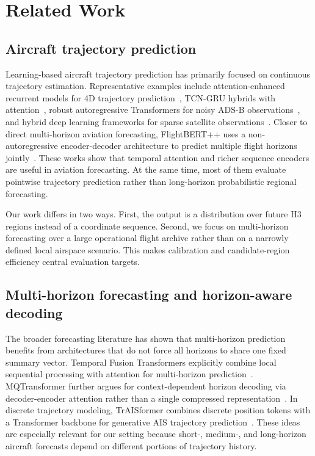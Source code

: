 \section{Related Work}

\subsection{Aircraft trajectory prediction}

Learning-based aircraft trajectory prediction has primarily focused on continuous trajectory estimation. Representative examples include attention-enhanced recurrent models for 4D trajectory prediction~\cite{jia2022attentionlstm}, TCN-GRU hybrids with attention~\cite{ma2024attentiontcngru}, robust autoregressive Transformers for noisy ADS-B observations~\cite{li2025noiserobust}, and hybrid deep learning frameworks for sparse satellite observations~\cite{shan2025sparse}. Closer to direct multi-horizon aviation forecasting, FlightBERT++ uses a non-autoregressive encoder-decoder architecture to predict multiple flight horizons jointly~\cite{guo_flightbertpp_2024}. These works show that temporal attention and richer sequence encoders are useful in aviation forecasting. At the same time, most of them evaluate pointwise trajectory prediction rather than long-horizon probabilistic regional forecasting.

Our work differs in two ways. First, the output is a distribution over future H3 regions instead of a coordinate sequence. Second, we focus on multi-horizon forecasting over a large operational flight archive rather than on a narrowly defined local airspace scenario. This makes calibration and candidate-region efficiency central evaluation targets.

\subsection{Multi-horizon forecasting and horizon-aware decoding}

The broader forecasting literature has shown that multi-horizon prediction benefits from architectures that do not force all horizons to share one fixed summary vector. Temporal Fusion Transformers explicitly combine local sequential processing with attention for multi-horizon prediction~\cite{lim2021tft}. MQTransformer further argues for context-dependent horizon decoding via decoder-encoder attention rather than a single compressed representation~\cite{mqtransformer2020}. In discrete trajectory modeling, TrAISformer combines discrete position tokens with a Transformer backbone for generative AIS trajectory prediction~\cite{nguyen_traisformer_2021}. These ideas are especially relevant for our setting because short-, medium-, and long-horizon aircraft forecasts depend on different portions of trajectory history.

